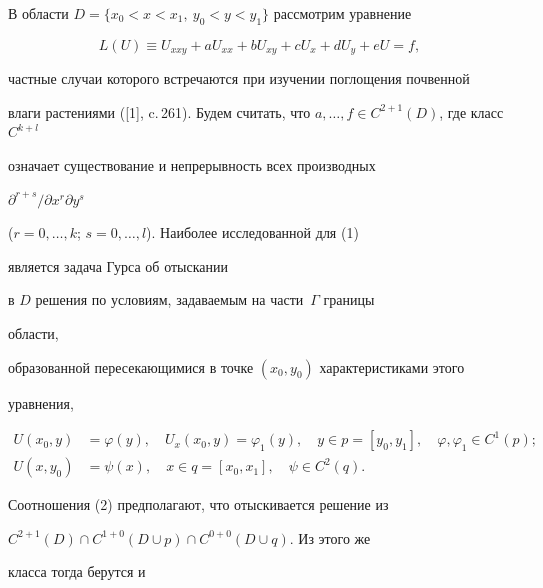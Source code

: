 \label{begin} 


 


 


В области $D=\{x_0<x<x_1,\ y_0<y<y_1\}$ рассмотрим уравнение 


\begin{equation} 


L(U)\equiv U_{xxy}+a U_{xx}+b U_{xy}+c U_x+d U_y +e U=f, 


\end{equation} 


частные случаи которого встречаются при изучении поглощения почвенной  


влаги растениями ([1], c.\,261). Будем считать, что $a,\dotsc,f\in 


C^{2+1}(D)$, где класс $C^{k+l}$ 


означает существование и непрерывность всех производных 


$\partial^{r+s}/\partial x^r\partial y^s$ 


($r=0,\dotsc,k$; $s=0,\dotsc,l$). Наиболее исследованной для (1) 


является задача Гурса об отыскании  


в $D$ решения по условиям, задаваемым на части~$\Gamma$ границы 


области,  


образованной пересекающимися в точке $(x_0,y_0)$ характеристиками этого  


уравнения, 


\begin{equation} 


\begin{split} 


U(x_0,y)&=\varphi(y),\quad U_x(x_0,y)=\varphi_1(y), 


\quad y\in p=[y_0,y_1],\quad \varphi,\varphi_1\in C^1(p);\\ 


U(x,y_0)&=\psi(x),\quad x\in q=[x_0,x_1],\quad \psi\in C^2(q). 


\end{split} 


\end{equation} 


Соотношения (2) предполагают, что отыскивается решение из  


$C^{2+1}(D)\cap C^{1+0}(D\cup p)\cap C^{0+0}(D\cup q)$. Из этого же 


класса тогда берутся и 


